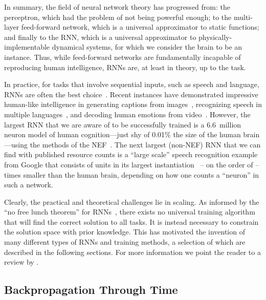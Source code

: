 In summary, the field of neural network theory has progressed from: the perceptron, which had the problem of not being powerful enough; to the multi-layer feed-forward network, which is a universal approximator to static functions; and finally to the RNN, which is a universal approximator to physically-implementable dynamical systems, for which we consider the brain to be an instance.
Thus, while feed-forward networks are fundamentally incapable of reproducing human intelligence, RNNs are, at least in theory, up to the task.

In practice, for tasks that involve sequential inputs, such as speech and language, RNNs are often the best choice~\citep{lecun2015deep}.
Recent instances have demonstrated impressive human-like intelligence in generating captions from images~\citep{vinyals2015show}, recognizing speech in multiple languages~\citep{amodei2016deep}, and decoding human emotions from video~\citep{ebrahimi2015recurrent}.
However, the largest RNN that we are aware of to be successfully trained is a 6.6~million neuron model of human cognition---just shy of 0.01\% the size of the human brain---using the methods of the NEF~\citep{choo2018}.
The next largest (non-NEF) RNN that we can find with published resource counts is a ``large scale'' speech recognition example from Google that consists of  units in its largest instantiation~\citep[][Table~1]{sak2014long} -- on the order of -- times smaller than the human brain, depending on how one counts a ``neuron'' in such a network.

Clearly, the practical and theoretical challenges lie in scaling.
As informed by the ``no free lunch theorem'' for RNNs~\citep{wiklicky1994non}, there exists no universal training algorithm that will find the correct solution to all tasks.
It is instead necessary to constrain the solution space with prior knowledge.
This has motivated the invention of many different types of RNNs and training methods, a selection of which are described in the following sections.
For more information we point the reader to a review by \citet{salehinejad2017recent}.

\subsection{Backpropagation Through Time}

